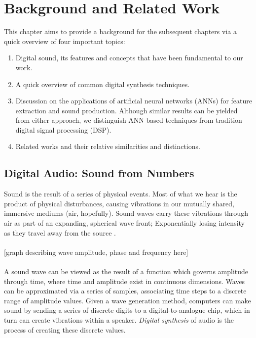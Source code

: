 \documentclass[\main/thesis.tex]{subfiles}
\begin{document}
\chapter{Background and Related Work}

%    

This chapter aims to provide a background for the subsequent chapters via a quick overview of four important topics:\\ 
\begin{enumerate}[label=(\roman*)]
\item Digital sound, its features and concepts that have been fundamental to our work.
\item A quick overview of common digital synthesis techniques.
\item Discussion on the applications of artificial neural networks (ANNs) for feature extraction and sound production. Although similar results can be yielded from either approach, we distinguish ANN based techniques from tradition digital signal processing (DSP).
\item Related works and their relative similarities and distinctions.
\end{enumerate}
\section{Digital Audio: Sound from Numbers}
Sound is the result of a series of physical events. Most of what we hear is the product of physical disturbances, causing vibrations in our mutually shared, immersive mediums (air, hopefully). Sound waves carry these vibrations through air as part of an expanding, spherical wave front; Exponentially losing intensity as they travel away from the source \cite{cook1999chap4}. 
\\\\

[graph describing wave amplitude, phase and frequency here]
\\\\
A sound wave can be viewed as the result of a function which governs amplitude through time, where time and amplitude exist in continuous dimensions. Waves can be approximated via a series of samples, associating time steps to a discrete range of amplitude values. 
Given a wave generation method, computers can make sound by sending a series of discrete digits to a digital-to-analogue chip, which in turn can
create vibrations within a speaker.  \textit{Digital synthesis} of audio is the process of creating these discrete values. 
\\
\end{document}
